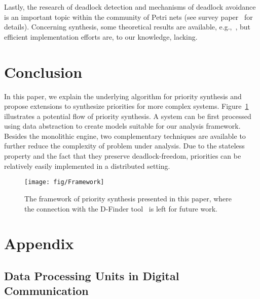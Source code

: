 \documentclass[10pt, a4paper, onecolumn, conference, compsocconf]{IEEEtran}
\begin{document}
Lastly, the research of deadlock detection and mechanisms of deadlock avoidance is an important topic within the community of Petri nets (see survey paper~\cite{li2008survey} for details). Concerning synthesis, some theoretical results are available, e.g.,~\cite{iordache2002synthesis}, but efficient implementation efforts are, to our knowledge, lacking.


\section{Conclusion\label{sec.algo.prioritysyn.conclusion}}

 In this paper, we explain the underlying algorithm for priority synthesis and propose extensions to synthesize priorities for more complex systems. Figure~\ref{fig:algo.prioritysyn.framework} illustrates a potential flow of priority synthesis. A system can be first processed using data abstraction to create models suitable for our analysis framework. Besides the monolithic engine, two complementary techniques are available to further reduce the complexity of problem under analysis. Due to the stateless property and the fact that they preserve deadlock-freedom, priorities can be relatively easily implemented in a distributed setting.


\begin{figure}[t]
\centering
 \texttt{[image: fig/Framework]}
  \caption{The framework of priority synthesis presented in this paper, where the connection with the D-Finder tool~\cite{bensalem:dfinder2:2011} is left for future work.}
 \label{fig:algo.prioritysyn.framework}
\end{figure}

\appendix
\section{Appendix\label{app.algo.prioritysyn.proofs}}

\subsection{Data Processing Units in Digital Communication\label{appsub.algo.prioritysyn.dpu}}
\end{document}
